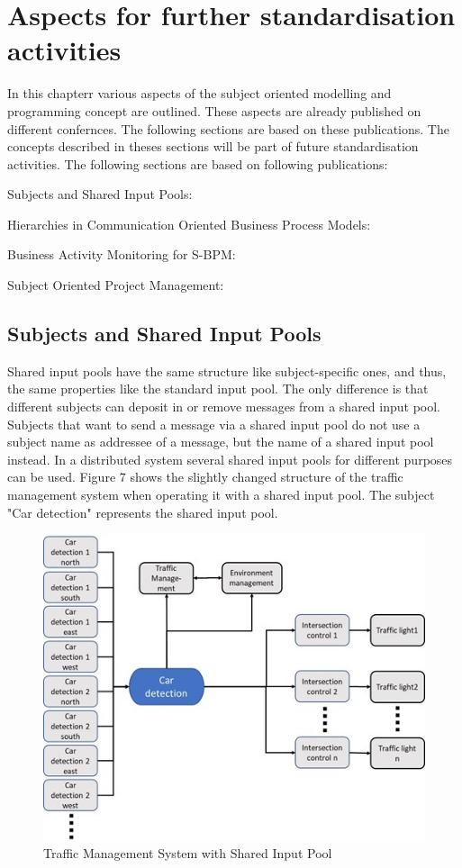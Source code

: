 \chapter{Aspects for further standardisation activities}
In this chapterr various aspects of the subject oriented modelling and programming concept are outlined. These aspects are already published on different confernces. The following sections are based on these publications.
The concepts described in theses sections will be part of future standardisation activities.
The following sections are based on following publications:\\
\begin{list}{-}
	\item Subjects and Shared Input Pools:
	\item Hierarchies in Communication Oriented Business Process Models:
	\item Business Activity Monitoring for S-BPM:
	\item Subject Oriented Project Management:
\end{list}

\section{Subjects and Shared Input Pools}

Shared input pools have the same structure like subject-specific ones, and thus, the same properties like the standard input pool. The only difference is that different subjects can deposit in or remove messages from a shared input pool. Subjects that want to send a message via a shared input pool do not use a subject name as addressee of a message, but the name of a shared input pool instead. In a distributed system several shared input pools for different purposes can be used. Figure 7 shows the slightly changed structure of the traffic management system when operating it with a shared input pool. The subject "Car detection" represents the shared input pool.


\begin{figure}[htbp]
	\centering
	\includegraphics[width=0.7\linewidth]{Figures/Chapter5/figuresshared/SharedInputPoolExample.jpg}
	\caption[Traffic Management System with Shared Input Pool]{Traffic Management System with Shared Input Pool}
	\label{fig:SharedInputPooTraffic}
\end{figure}


